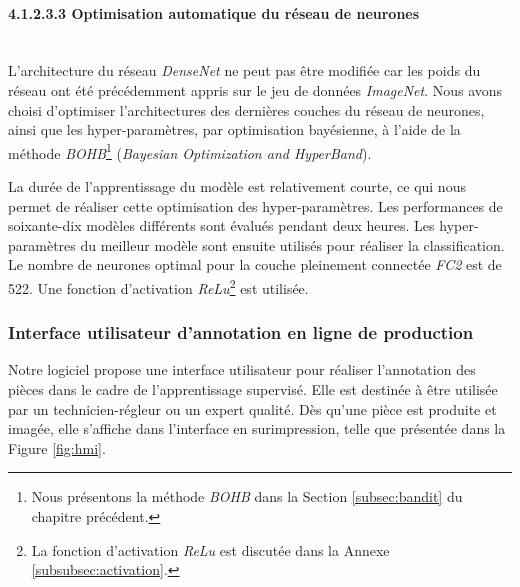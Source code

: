 \paragraph{4.1.2.3.3 Optimisation automatique du réseau de neurones} \mbox{} \\
L'architecture du réseau \textit{DenseNet} ne peut pas être modifiée car les poids du réseau ont été précédemment appris sur le jeu de données \textit{ImageNet}.
Nous avons choisi d'optimiser l'architectures des dernières couches du réseau de neurones, ainsi que les hyper-paramètres, par optimisation bayésienne, à l'aide de la méthode \textit{BOHB}\footnote{Nous présentons la méthode \textit{BOHB} dans la Section \ref{subsec:bandit} du chapitre précédent.} (\textit{Bayesian Optimization and HyperBand}).

La durée de l'apprentissage du modèle est relativement courte, ce qui nous permet de réaliser cette optimisation des hyper-paramètres.
Les performances de soixante-dix modèles différents sont évalués pendant deux heures.
Les hyper-paramètres du meilleur modèle sont ensuite utilisés pour réaliser la classification.
Le nombre de neurones optimal pour la couche pleinement connectée \textit{FC2} est de 522.
Une fonction d'activation \textit{ReLu}\footnote{La fonction d'activation \textit{ReLu} est discutée dans la Annexe \ref{subsubsec:activation}.} est utilisée.


\FloatBarrier
\subsubsection{Interface utilisateur d'annotation en ligne de production} \label{subsubsec:hmi}
Notre logiciel propose une interface utilisateur pour réaliser l'annotation des pièces dans le cadre de l'apprentissage supervisé.
Elle est destinée à être utilisée par un technicien-régleur ou un expert qualité.
Dès qu'une pièce est produite et imagée, elle s'affiche dans l'interface en surimpression, telle que présentée dans la Figure \ref{fig:hmi}.

